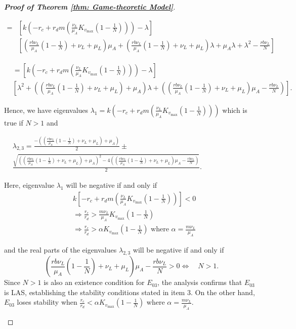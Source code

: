 \documentclass{article}
\theoremstyle{remark}
\theoremstyle{custom} %
\begin{document}
\begin{proof}[\textbf{Proof of Theorem \ref{thm: Game-theoretic Model}}]
\begin{itemize}
$$
\begin{aligned}
= & {\left[k\left(-r_c+r_d m\left(\frac{\nu_L}{\mu_A} K_{v_{\max }}\left(1-\frac{1}{{N}}\right)\right)\right)-\lambda\right] } \\
& {\left[\left(\frac{r b \nu_L}{\mu_A}\left(1-\frac{1}{{N}}\right)+\nu_L+\mu_L\right) \mu_A+\left(\frac{r b \nu_L}{\mu_A}\left(1-\frac{1}{{N}}\right)+\nu_L+\mu_L\right) \lambda+\mu_A \lambda+\lambda^2-\frac{r b \nu_L}{{N}}\right] }
\end{aligned}
$$

$$
\begin{aligned} 
& =\left[k\left(-r_c+r_d  m\left(\frac{\nu_L}{\mu_A} K_{v_{\max }}\left(1-\frac{1}{{N}}\right)\right)\right)-\lambda\right]  \\
& {\left[\lambda^2+\left(\left(\frac{r b \nu_L}{\mu_A}\left(1-\frac{1}{{N}}\right)+\nu_L+\mu_L\right)+\mu_A\right) \lambda+\left(\left(\frac{r b \nu_L}{\mu_A}\left(1-\frac{1}{{N}}\right)+\nu_L+\mu_L\right) \mu_A-\frac{r b \nu_L}{{N}}\right)\right]}.
\end{aligned}
$$

Hence, we have eigenvalues $\lambda_1=k\left(-r_c+r_d m\left(\frac{\nu_L}{\mu_A} K_{v_{\max }}\left(1-\frac{1}{{N}}\right)\right)\right)
$ which is true if $N>1$  and

$
\begin{aligned}
& \lambda_{2,3}=\frac{-\left(\left(\frac{r b \nu_L}{\mu_A}\left(1-\frac{1}{{N}}\right)+\nu_L+\mu_L\right)+\mu_A\right)}{2} \pm \\
& \frac{\sqrt{\left(\left(\frac{r b \nu_L}{\mu_A}\left(1-\frac{1}{{N}}\right)+\nu_L+\mu_L\right)+\mu_A\right)^2-4\left(\left(\frac{r b \nu_L}{\mu_A}\left(1-\frac{1}{{N}}\right)+\nu_L+\mu_L\right) \mu_A-\frac{r b \nu_L}{{N}}\right)}}{2}.
\end{aligned}
$

Here, eigenvalue \(\lambda_1\) will be negative if and only if $$
\begin{aligned}
& k\left[-r_c+r_d m\left(\frac{\nu_L}{\mu_A} K_{v_{\max }}\left(1-\frac{1}{{N}}\right)\right)\right]<0 \\
& \Rightarrow \frac{r_c}{r_d}>\frac{m \nu_L}{\mu_A} K_{v_{\max }}\left(1-\frac{1}{{N}}\right) \\
& \Rightarrow \frac{r_c}{r_d}>\alpha K_{v_{\max }}\left(1-\frac{1}{{N}}\right) \text { where } \alpha=\frac{m \nu_L}{\mu_A}
\end{aligned}
$$

and the real parts of the eigenvalues \(\lambda_{2, 3}\) will be negative if and only if
$$
\left(\frac{r b \nu_L}{\mu_A}\left(1-\frac{1}{{N}}\right)+\nu_L+\mu_L\right) \mu_A-\frac{r b \nu_L}{{N}}>0 
 \Leftrightarrow \quad {N}>1.
$$ 
 Since $N>1$ is also an existence condition for $E_{03}$, the analysis confirms that $E_{03}$ is LAS, establishing the stability conditions stated in item 3. On the other hand, $E_{03}$ loses stability when $\frac{r_c}{r_d}<\alpha K_{v_{\max }}\left(1-\frac{1}{N}\right)$ where $\alpha=\frac{m \nu_L}{\mu_A}$.



\end{itemize}
\end{proof}
\end{document}
